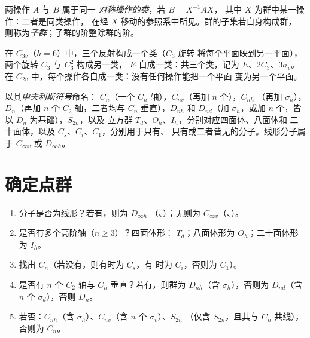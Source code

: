 \begin{definition}[对称操作的类，子群]\label{def:b3:point-groups:class}
两操作 $A$ 与 $B$ 属于同一
\emph{对称操作的类}，若 $B = X^{-1}AX$，
其中 $X$ 为群中某一操作：二者是同类操作，
在经 $X$ 移动的参照系中所见。群的子集若自身构成群，
则称为\emph{子群}；子群的阶整除群的阶。
\end{definition}

\begin{example}[\ce{NH3} 的类]\label{ex:b3:point-groups:classes}
在 $C_{3v}$（$h = 6$）中，三个反射构成一个类（$C_3$ 旋转
将每个平面映到另一平面），两个旋转 $C_3$ 与 $C_3^2$ 构成另一类，
$E$ 自成一类：共三个类，记为 $E$、$2C_3$、$3\sigma_v$。在
$C_{2v}$ 中，每个操作各自成一类：没有任何操作能把一个平面
变为另一个平面。
\end{example}

\begin{definition}[申夫利斯符号]\label{def:b3:point-groups:schoenflies}
以其\emph{申夫利斯符号}命名：
$C_n$（一个 $C_n$ 轴），$C_{nv}$（再加 $n$ 个），$C_{nh}$
（再加 $\sigma_h$），$D_n$（再加 $n$ 个 $C_2$ 轴，二者均与 $C_n$ 垂直），$D_{nh}$
和 $D_{nd}$（加 $\sigma_h$，或加 $n$ 个，皆以 $D_n$ 为基础），$S_{2n}$，以及
立方群 $T_d$、$O_h$、$I_h$，分别对应四面体、八面体和
二十面体，以及 $C_s$、$C_i$、$C_1$，分别用于只有、
只有或二者皆无的分子。线形分子属于
$C_{\infty v}$ 或 $D_{\infty h}$。
\end{definition}

\section{确定点群}

\begin{method}[确定分子的点群]\label{met:b3:point-groups:assign}
\begin{enumerate}
  \item 分子是否为线形？若有，则为 $D_{\infty h}$
        （、）；无则为 $C_{\infty v}$（、）。
  \item 是否有多个高阶轴（$n \ge 3$）？四面体形：
        $T_d$；八面体形为 $O_h$；二十面体形为 $I_h$。
  \item 找出 $C_n$（若没有，则有时为 $C_s$，有
        时为 $C_i$，否则为 $C_1$）。
  \item 是否有 $n$ 个 $C_2$ 轴与 $C_n$ 垂直？若有，则群为
        $D_{nh}$（含 $\sigma_h$），否则为 $D_{nd}$（含 $n$ 个 $\sigma_d$），否则
        $D_n$。
  \item 若否：$C_{nh}$（含 $\sigma_h$）、$C_{nv}$（含 $n$ 个 $\sigma_v$）、$S_{2n}$
        （仅含 $S_{2n}$，且其与 $C_n$ 共线），否则为 $C_n$。
\end{enumerate}
\end{method}

